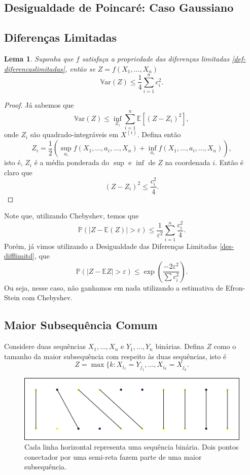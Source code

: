 \documentclass[12pt,a4paper,oneside]{book}
\newtheorem{lemma}[theorem]{Lema}
\theoremstyle{definition}
\theoremstyle{remark}
\numberwithin{equation}{section}
\newcommand{\e}{\varepsilon}
\newcommand{\E}{\mathbb{E}}
\newcommand{\pr}{\mathbb{P}}
\newcommand{\ds}{\displaystyle}
\newcommand{\Var}{\mathbb{V}\text{ar}}
\begin{document}
\subsection{Desigualdade de Poincaré: Caso Gaussiano}

\subsection{Diferenças Limitadas}

\begin{lemma}
Suponha que $f$ satisfaça a propriedade das diferenças limitadas \ref{def-diferencaslimitadas}, então se $Z= f(X_1,\dots,X_n)$
$$\Var(Z) \leq \dfrac{1}{4}\sum_{i=1}^n c_i^2. $$
\end{lemma}
\begin{proof}
Já sabemos que
$$\Var(Z)\leq  \inf_{Z_i} \sum_{i=1}^n \E\left[(Z-Z_i)^2\right], $$
onde $Z_i$ são quadrado-integráveis em $X^{(i)}.$
Defina então
$$Z_i = \dfrac{1}{2}\left(\ds\sup_{a_i} f(X_1,\dots,a_i,\dots,X_n)+ \ds\inf_{a_i} f(X_1,\dots,a_i,\dots,X_n)\right), $$
isto é, $Z_i$ é a média ponderada do $\sup $ e $\inf$ de $Z$ na coordenada $i$. Então é claro que
$$(Z-Z_i)^2 \leq \dfrac{c_i^2}{4}. $$
\end{proof}


\begin{tcolorbox}[colback = yellow!60]
Note que, utilizando Chebyshev, temos que
$$\pr(|Z-\E(Z)|>\e) \leq \dfrac{1}{\e^2}\sum_{i=1}^n\dfrac{c_i^2}{4}.$$
Porém, já vimos utilizando a Desigualdade das Diferenças Limitadas \ref{des-difflimitd}, que 
$$\pr (|Z-\E Z|>\e) \leq \exp\left(  \dfrac{-2\e^2}{\sum c_i^2}     \right). $$
Ou seja, nesse caso, não ganhamos em nada utilizando a estimativa de Efron-Stein com Chebyshev.
\end{tcolorbox}




\subsection{Maior Subsequência Comum} Considere duas sequências $X_1,\dots,X_n$ e $Y_1,\dots,Y_n$ binárias. Defina $Z$  como o tamanho da maior subsequência com respeito às duas sequências, isto é
$$Z = \max \{k: X_{i_1}=Y_{j_1},\dots, X_{i_k}=X_{j_k}. $$

\begin{figure}[h]
\centering %
\includegraphics[width=15cm]{lgc} %
\caption{Cada linha horizontal representa uma sequência binária. Dois pontos conectador por uma semi-reta fazem parte de uma maior subsequência.  }
\end{figure}
\end{document}
